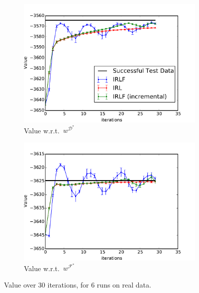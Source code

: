 \documentclass[a4paper,11pt]{report}
\begin{document}
\begin{figure}[h!]
	\centering
	\begin{subfigure}[b]{0.4\columnwidth}
    \includegraphics[trim=0.5cm 0.5cm 0.2cm 0.2,clip=true,width=1.1\textwidth]{figures/expert_apprentice_real.pdf}
    \caption{Value w.r.t.\ $w^{\mathcal{D}^*}$}
    \end{subfigure}
    \hspace{6mm}
    \begin{subfigure}[b]{0.4\columnwidth}
    \includegraphics[trim=0.5cm 0.5cm 0.2cm 0.2,clip=true,width=1.1\textwidth]{figures/taboo_apprentice_real.pdf}
    \caption{Value w.r.t.\ $w^{\mathcal{F}^*}$}
  	\end{subfigure}
  \caption{Value over 30 iterations, for 6 runs on real data.}
  \label{fig:real_data}
  \vspace{-2mm}
\end{figure}
\end{document}
